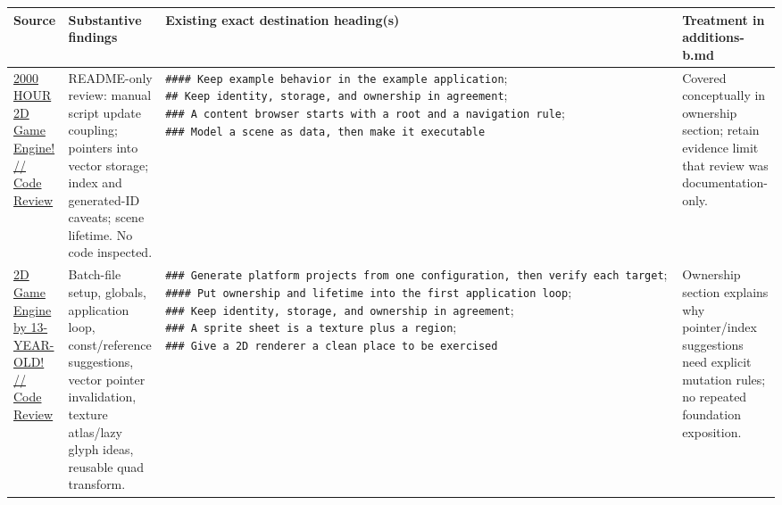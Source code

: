 {\def\LTcaptype{none} %
\begin{longtable}[]{@{}
  >{\raggedright\arraybackslash}p{}
  >{\raggedright\arraybackslash}p{}
  >{\raggedright\arraybackslash}p{}
  >{\raggedright\arraybackslash}p{}@{}}
\toprule\noalign{}
\begin{minipage}[b]{\linewidth}\raggedright
Source
\end{minipage} & \begin{minipage}[b]{\linewidth}\raggedright
Substantive findings
\end{minipage} & \begin{minipage}[b]{\linewidth}\raggedright
Existing exact destination heading(s)
\end{minipage} & \begin{minipage}[b]{\linewidth}\raggedright
Treatment in additions-b.md
\end{minipage} \\
\midrule\noalign{}
\endhead
\bottomrule\noalign{}
\endlastfoot
\href{https://www.youtube.com/watch?v=5b95WTHZ9HE}{2000 HOUR 2D Game Engine! // Code Review} & README-only review: manual script update coupling; pointers into vector storage; index and generated-ID caveats; scene lifetime. No code inspected. & \texttt{\#\#\#\#\ Keep\ example\ behavior\ in\ the\ example\ application}; \texttt{\#\#\ Keep\ identity,\ storage,\ and\ ownership\ in\ agreement}; \texttt{\#\#\#\ A\ content\ browser\ starts\ with\ a\ root\ and\ a\ navigation\ rule}; \texttt{\#\#\#\ Model\ a\ scene\ as\ data,\ then\ make\ it\ executable} & Covered conceptually in ownership section; retain evidence limit that review was documentation-only. \\
\href{https://www.youtube.com/watch?v=9HCboZHTyrw}{2D Game Engine by 13-YEAR-OLD! // Code Review} & Batch-file setup, globals, application loop, const/reference suggestions, vector pointer invalidation, texture atlas/lazy glyph ideas, reusable quad transform. & \texttt{\#\#\#\ Generate\ platform\ projects\ from\ one\ configuration,\ then\ verify\ each\ target}; \texttt{\#\#\#\#\ Put\ ownership\ and\ lifetime\ into\ the\ first\ application\ loop}; \texttt{\#\#\#\ Keep\ identity,\ storage,\ and\ ownership\ in\ agreement}; \texttt{\#\#\#\ A\ sprite\ sheet\ is\ a\ texture\ plus\ a\ region}; \texttt{\#\#\#\ Give\ a\ 2D\ renderer\ a\ clean\ place\ to\ be\ exercised} & Ownership section explains why pointer/index suggestions need explicit mutation rules; no repeated foundation exposition. \\

\end{longtable}}
